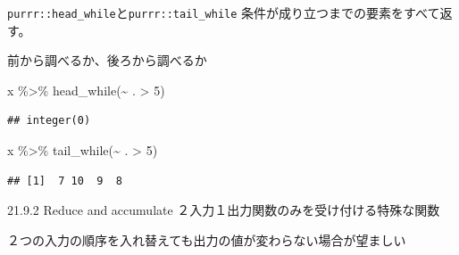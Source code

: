 \documentclass[
  ignorenonframetext,
  aspectratio=169]{beamer}
\newenvironment{Shaded}{\begin{snugshade}}{\end{snugshade}}
\newcommand{\DecValTok}[1]{\textcolor[rgb]{0.00,0.00,0.81}{#1}}
\newcommand{\FunctionTok}[1]{\textcolor[rgb]{0.00,0.00,0.00}{#1}}
\newcommand{\NormalTok}[1]{#1}
\newcommand{\SpecialCharTok}[1]{\textcolor[rgb]{0.00,0.00,0.00}{#1}}
\begin{document}
\begin{frame}[fragile]{\texttt{purrr::head\_while}と\texttt{purrr::tail\_while}}
\protect\hypertarget{purrrhead_whileux3068purrrtail_while}{}
条件が成り立つまでの要素をすべて返す。

前から調べるか、後ろから調べるか

\begin{Shaded}
\begin{Highlighting}[]
\NormalTok{x }\SpecialCharTok{\%\textgreater{}\%} \FunctionTok{head\_while}\NormalTok{(}\SpecialCharTok{\textasciitilde{}}\NormalTok{ . }\SpecialCharTok{\textgreater{}} \DecValTok{5}\NormalTok{)}
\end{Highlighting}
\end{Shaded}

\begin{verbatim}
## integer(0)
\end{verbatim}

\begin{Shaded}
\begin{Highlighting}[]
\NormalTok{x }\SpecialCharTok{\%\textgreater{}\%} \FunctionTok{tail\_while}\NormalTok{(}\SpecialCharTok{\textasciitilde{}}\NormalTok{ . }\SpecialCharTok{\textgreater{}} \DecValTok{5}\NormalTok{)}
\end{Highlighting}
\end{Shaded}

\begin{verbatim}
## [1]  7 10  9  8
\end{verbatim}
\end{frame}

\begin{frame}{21.9.2 Reduce and accumulate}
\protect\hypertarget{reduce-and-accumulate}{}
２入力１出力関数のみを受け付ける特殊な関数

２つの入力の順序を入れ替えても出力の値が変わらない場合が望ましい
\end{frame}
\end{document}
